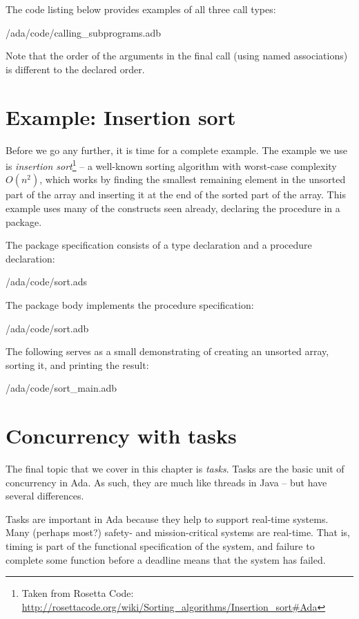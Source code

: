 The code listing below provides examples of all three call types:

 {\rootdir/ada/code/calling_subprograms.adb}

Note that the order of the arguments in the final call (using named associations) is different to the declared order.

\section{Example: Insertion sort}

Before we go any further, it is time for a complete example. The example we use is \emph{insertion sort}\footnote{Taken from Rosetta Code: \url{http://rosettacode.org/wiki/Sorting_algorithms/Insertion_sort\#Ada}} -- a well-known sorting algorithm with worst-case complexity $O(n^2)$, which works by finding the smallest remaining element in the unsorted part of the array and inserting it at the end of the sorted part of the array. This example uses many of the constructs seen already, declaring the procedure in a package. 

The package specification consists of a type declaration and a procedure declaration:

 {\rootdir/ada/code/sort.ads}

The package body implements the procedure specification:

 {\rootdir/ada/code/sort.adb}

The following serves as a small demonstrating of creating an unsorted array, sorting it, and printing the result:


 {\rootdir/ada/code/sort_main.adb}

\section{Concurrency with tasks}

 The final topic that we cover in this chapter is \emph{tasks}. Tasks are the basic unit of concurrency in Ada.  As such, they are much like threads in Java -- but have several differences.

Tasks are important in Ada because they help to support real-time systems. Many (perhaps most?) safety- and mission-critical systems are real-time. That is, timing is part of the functional specification of the system, and failure to complete some function before a deadline means that the system has failed.

